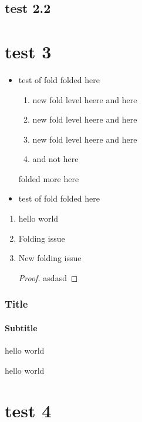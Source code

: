 \documentclass[%
  fontsize=12pt,
  headings=big,
  english,
  paper=a4,
  twoside,
  open=right,
  DIV=14,
  BCOR=20mm,
  headinclude=false,
  footinclude=false,
  mpinclude=false,
  pagesize,
  titlepage,
  parskip=half,
  headsepline,
  chapterprefix=false,
  appendixprefix=Appendix,
  appendixwithprefixline=true,
  bibliography=totoc,
  toc=graduated,
  numbers=noenddot,
]{scrbook}
\begin{document}
\subsection{test 2.2}

\section{test 3}

\begin{itemize}
  \item test of fold
    folded here
    \begin{enumerate}
      \item new fold level heere
        and here
      \item new fold level heere
        and here
      \item new fold level heere
        and here
      \item and not here
    \end{enumerate}
    folded more here
  \item test of fold
    folded here
\end{itemize}

\begin{enumerate}
  \item \begin{test}
      hello
      world
    \end{test}

  \item Folding issue

  \item New folding issue \begin{proof}
      asdasd
    \end{proof}
\end{enumerate}

\begin{frame}
  \frametitle{Title}
  \framesubtitle{Subtitle}

  hello world
\end{frame}

\begin{frame}[noframenumbering]  %
  hello world
\end{frame}

\section{
  test 4
}
\end{document}
